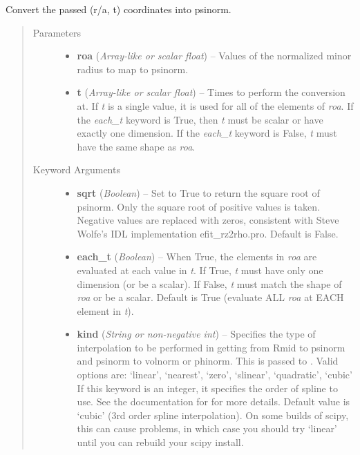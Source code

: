 \documentclass[letterpaper,10pt,english]{sphinxmanual}
\begin{document}
\begin{fulllineitems}
\begin{fulllineitems}
\label{eqtools:eqtools.core.Equilibrium.roa2psinorm}
Convert the passed (r/a, t) coordinates into psinorm.
\begin{quote}\begin{description}
\item[{Parameters}] \leavevmode\begin{itemize}
\item {} 
\textbf{roa} (\emph{Array-like or scalar float}) --
Values of the normalized minor
radius to map to psinorm.

\item {} 
\textbf{t} (\emph{Array-like or scalar float}) --
Times to perform the conversion at.
If \emph{t} is a single value, it is used for all of the elements of
\emph{roa}. If the \emph{each\_t} keyword is True, then \emph{t} must be scalar
or have exactly one dimension. If the \emph{each\_t} keyword is False,
\emph{t} must have the same shape as \emph{roa}.

\end{itemize}

\item[{Keyword Arguments}] \leavevmode\begin{itemize}
\item {} 
\textbf{sqrt} (\emph{Boolean}) --
Set to True to return the square root of psinorm.
Only the square root of positive values is taken. Negative
values are replaced with zeros, consistent with Steve Wolfe's
IDL implementation efit\_rz2rho.pro. Default is False.

\item {} 
\textbf{each\_t} (\emph{Boolean}) --
When True, the elements in \emph{roa} are evaluated
at each value in \emph{t}. If True, \emph{t} must have only one dimension
(or be a scalar). If False, \emph{t} must match the shape of \emph{roa}
or be a scalar. Default is True (evaluate ALL \emph{roa} at EACH
element in \emph{t}).

\item {} 
\textbf{kind} (\emph{String or non-negative int}) --
Specifies the type of
interpolation to be performed in getting from Rmid to
psinorm and psinorm to volnorm or phinorm. This is passed to
. Valid options are:
`linear', `nearest', `zero', `slinear', `quadratic', `cubic'
If this keyword is an integer, it specifies the order of spline
to use. See the documentation for  for more
details. Default value is `cubic' (3rd order spline
interpolation). On some builds of scipy, this can cause problems,
in which case you should try `linear' until you can rebuild your
scipy install.


\end{itemize}
\end{description}
\end{quote}
\end{fulllineitems}
\end{fulllineitems}
\end{document}
